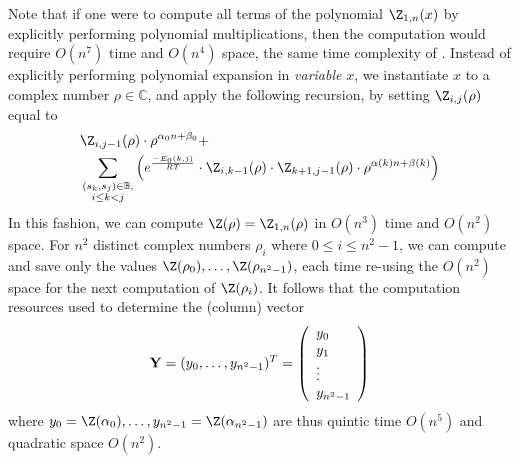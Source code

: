 Note that if one were to compute all terms of the polynomial $\Z_{1,n}(x)$
by explicitly performing polynomial multiplications,
then the computation would require $O(n^7)$ time and $O(n^4)$ space, the
same time complexity of \citep{hofacker:RNAbor2D}.
Instead of explicitly performing polynomial expansion in {\em variable} $x$,
we instantiate $x$ to a
complex number $\rho \in \mathbb{C}$, and apply
the following recursion, by setting $\Z_{i,j}(\rho)$ equal to
\begin{eqnarray}
\label{eq:RNAborNussRecursionInstantiated}
&\Z_{i,j-1}(\rho) \cdot \rho^{\alpha_0n+\beta_0} + \\
&\sum_{\substack{(s_k,s_j) \in \mathbb{B},\\i\le k<j}}
\left(e^{\frac{-E_0(k,j)}{RT}}\cdot
\Z_{i,k-1}(\rho)\cdot\Z_{k+1,j-1}(\rho)
\cdot \rho^{\alpha(k)n+\beta(k)} \right) \nonumber
\end{eqnarray}
In this fashion, we can compute $\Z(\rho)=\Z_{1,n}(\rho)$ in
$O(n^3)$ time and $O(n^2)$ space. For $n^2$ distinct complex numbers
$\rho_i$ where $0 \leq i \leq n^2-1$, we can compute and save only the
values $\Z(\rho_0),\ldots, \Z(\rho_{n^2-1})$, each time re-using the
$O(n^2)$ space for the next computation of $\Z(\rho_i)$.
It follows that
the computation resources used to determine the (column) vector
\begin{eqnarray}
\label{eq:defY}
{\bf Y} = (y_0,\ldots,y_{n^2-1})^T =
\left(
\begin{array}{l}
y_0\\
y_1\\
\vdots \\
y_{n^2-1}\\
\end{array}
\right)
\end{eqnarray}
where
$y_0=\Z(\alpha_0),\ldots, y_{n^2-1}=\Z(\alpha_{n^2-1})$ are thus
quintic time $O(n^5)$ and quadratic space $O(n^2)$.

